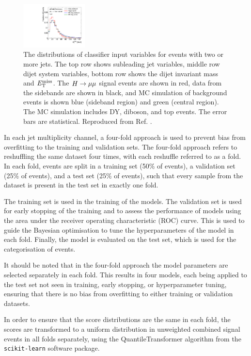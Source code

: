\begin{figure}[h!]
  \includegraphics[width=0.3\textwidth]{figures/hmumu/vars/metFinalTrk}
  \caption[Classifier input variables]{
  The distributions of classifier
  input variables for events with two or more jets. The top row shows subleading
  jet variables, middle row dijet system variables, bottom row shows the
  dijet invariant mass and $E_\text{T}^\text{miss}$. The $H \rightarrow \mu\mu$ signal events
  are shown in red, data from the sidebands are shown in black, and MC
  simulation of background events is shown blue (sideband region) and
  green (central region). The MC simulation includes DY, diboson, and top events.
  The error bars are statistical. Reproduced from Ref. \cite{ATLAS-CONF-2019-028}.
  }
  \label{fig:hmumu:variables2}
\end{figure}

In each jet multiplicity channel, a four-fold approach is used to
prevent bias from overfitting to the training and validation sets.
The four-fold approach refers to reshuffling the same dataset four times,
with each reshuffle referred to as a fold.
In each fold, events are split in a training set (50\% of events),
a validation set (25\% of events), and a test set (25\% of events),
such that every sample from the dataset is present in the test set in exactly one fold.

The training set is used in the training of the models. The validation
set is used for early stopping of the training and to assess the
performance of models using the area under the receiver operating characteristic (ROC)
\cite{journals/prl/Fawcett06} curve. This is used to guide the
Bayesian optimisation \cite{gp} to tune the hyperparameters of the
model in each fold. Finally, the model is evaluated on the test set,
which is used for the categorisation of events.

It should be noted that in the four-fold approach the model parameters
are selected separately in each fold. This results in four models,
each being applied to the test set not seen in training, early stopping,
or hyperparameter tuning, ensuring that there is no bias from overfitting
to either training or validation datasets.

In order to ensure that the score distributions are the same in each
fold, the scores are transformed to a uniform distribution in unweighted
combined signal events in all folds separately, using the QuantileTransformer
algorithm from the \texttt{scikit-learn} \cite{scikit-learn} software package.

